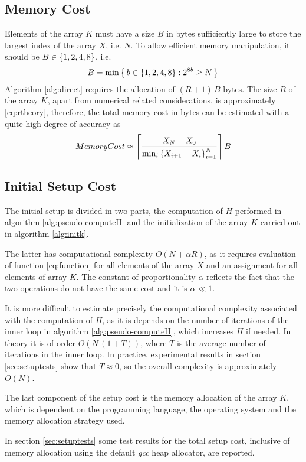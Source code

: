\documentclass[preprint,1p,times]{elsarticle}
\begin{document}
\subsection{Memory Cost}
\label{sec:memory}
Elements of the array $K$ must have a size $B$ in bytes sufficiently large to store the largest index of the array $X$, i.e. $N$. To allow efficient memory manipulation, it should be $B\in \left \{ 1,2,4,8 \right \}$, i.e.
$$
B = \min\left \{ \,b \in \left \{ 1,2,4,8 \right \}: 2^{8b} \geq N\, \right \}
$$
Algorithm \ref{alg:direct} requires the allocation of $(R+1)\, B$ bytes. The size $R$ of the array $K$, apart from numerical related considerations, is approximately \eqref{eq:rtheory}, therefore, the total memory cost in bytes can be estimated with a quite high degree of accuracy as
$$
	MemoryCost \approx \left \lceil \frac{X_N-X_0}{\min_i\left \{ X_{i+1}-X_i \right \}_{i=1}^N} \right \rceil B
$$

\subsection{Initial Setup Cost}
\label{sec:setupcost}
The initial setup is divided in two parts, the computation of $H$ performed in algorithm \eqref{alg:pseudo-computeH} and the initialization of the array $K$ carried out in algorithm \eqref{alg:initk}.

The latter has computational complexity $O(N + \alpha R)$, as it requires evaluation of function \eqref{eq:function} for all elements of the array $X$ and an assignment for all elements of array $K$. The constant of proportionality $\alpha$ reflects the fact that the two operations do not have the same cost and it is $\alpha \ll 1$.

It is more difficult to estimate precisely the computational complexity associated with the computation of $H$, as it is depends on the number of iterations of the inner loop in algorithm \eqref{alg:pseudo-computeH}, which increases $H$ if needed. In theory it is of order $O(N\,(1+T))$, where $T$ is the average number of iterations in the inner loop. In practice, experimental results in section \eqref{sec:setuptests} show that $T\approx 0$, so the overall complexity is approximately $O(N)$.

The last component of the setup cost is the memory allocation of the array $K$, which is dependent on the programming language, the operating system and the memory allocation strategy used.

In section \eqref{sec:setuptests} some test results for the total setup cost, inclusive of memory allocation using the default \textit{gcc} heap allocator, are reported.
 
\end{document}
